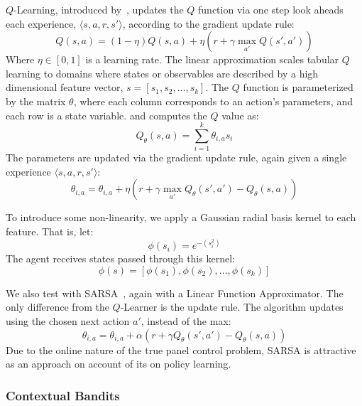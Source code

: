 \documentclass{article}
\begin{document}
{$Q$-Learning, introduced by~\citet{watkins1992q}, updates the $Q$ function via one step look aheads each experience, $\langle s, a, r, s' \rangle$, according to the gradient update rule:
\begin{equation}
Q(s,a) = (1-\eta) Q(s,a) + \eta(r + \gamma \max_{a'} Q(s', a'))
\end{equation}
Where $\eta \in [0,1]$ is a learning rate. The linear approximation scales tabular $Q$ learning to domains where states or observables are described by a high dimensional feature vector, $s = [s_1, s_2, \ldots, s_k]$. The $Q$ function is parameterized by the matrix $\theta$, where each column corresponds to an action's parameters, and each row is a state variable. and computes the $Q$ value as:
\begin{equation}
Q_\theta(s,a) = \sum_{i=1}^k \theta_{i,a} s_i
\end{equation}
The parameters are updated via the gradient update rule, again given a single experience $\langle s, a, r, s' \rangle$:
\begin{equation}
\theta_{i,a} = \theta_{i,a} + \eta \left( r + \gamma \max_{a'} Q_\theta(s',a') - Q_\theta(s,a)\right)
\end{equation}

To introduce some non-linearity, we apply a Gaussian radial basis kernel to each feature. That is, let:
\begin{equation}
\phi(s_i) = e^{-(s_i^2)}
\end{equation}
The agent receives states passed through this kernel:
\begin{equation}
\phi(s) = [\phi(s_1), \phi(s_2), \ldots, \phi(s_k)]
\end{equation}

We also test with SARSA~\cite{rummery1994line}, again with a Linear Function Approximator. The only difference from the $Q$-Learner is the update rule. The algorithm updates using the chosen next action $a'$, instead of the max:
\begin{equation}
\theta_{i,a} = \theta_{i,a} + \alpha \left( r + \gamma Q_\theta(s',a') - Q_\theta(s,a)\right)
\end{equation}
Due to the online nature of the true panel control problem, SARSA is attractive as an approach on account of its on policy learning.

\subsubsection{Contextual Bandits}

}
\end{document}
